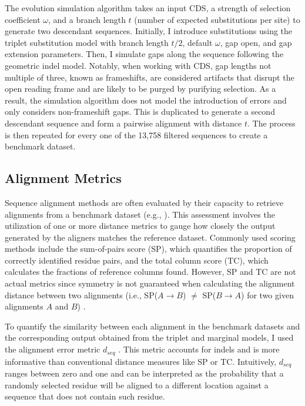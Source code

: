 The evolution simulation algorithm takes an input CDS, a strength of selection coefficient $\omega$, and a branch length $t$ (number of expected substitutions per site) to generate two descendant sequences. Initially, I introduce substitutions using the triplet substitution model with branch length $t/2$, default $\omega$, gap open, and gap extension parameters. Then, I simulate gaps along the sequence following the geometric indel model. Notably, when working with CDS, gap lengths not multiple of three, known as frameshifts, are considered artifacts that disrupt the open reading frame and are likely to be purged by purifying selection. As a result, the simulation algorithm does not model the introduction of errors and only considers non-frameshift gaps. This is duplicated to generate a second descendant sequence and form a pairwise alignment with distance $t$. The process is then repeated for every one of the 13,758 filtered sequences to create a benchmark dataset.

\subsection{Alignment Metrics}

Sequence alignment methods are often evaluated by their capacity to retrieve alignments from a benchmark dataset (e.g., \cite{clustal_omega_sievers_2011}). This assessment involves the utilization of one or more distance metrics to gauge how closely the output generated by the aligners matches the reference dataset. Commonly used scoring methods include the sum-of-pairs score (SP), which quantifies the proportion of correctly identified residue pairs, and the total column score (TC), which calculates the fractions of reference columns found. However, SP and TC are not actual metrics since symmetry is not guaranteed when calculating the alignment distance between two alignments (i.e., SP($A \rightarrow B$) $\neq$ SP($B \rightarrow A$) for two given alignments $A$ and $B$) \citep{metrics_blackburne_whelan_2011}.

To quantify the similarity between each alignment in the benchmark datasets and the corresponding output obtained from the triplet and marginal models, I used the alignment error metric $d_{seq}$ \citep{metrics_blackburne_whelan_2011}. This metric accounts for indels and is more informative than conventional distance measures like SP or TC. Intuitively, $d_{seq}$ ranges between zero and one and can be interpreted as the probability that a randomly selected residue will be aligned to a different location against a sequence that does not contain such residue.


